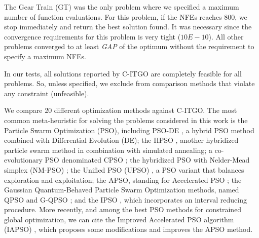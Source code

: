 

The Gear Train (GT) was the only problem where we specified a maximum number of function evaluations. For this problem, if the NFEs reaches 800, we stop immediately and return the best solution found. It was necessary since the convergence requirements for this problem is very tight ($10E-10$). All other problems converged to at least \textit{GAP} of the optimum without the requirement to specify a maximum NFEs.




In our tests, all solutions reported by C-ITGO are completely feasible for all problems. So, unless specified, we exclude from comparison methods that violate any constraint (unfeasible).

We compare 20 different optimization methods against C-ITGO. The most common meta-heuristic for solving the problems considered in this work is the Particle Swarm Optimization (PSO), including PSO-DE \citep{PSO-DE}, a hybrid PSO method combined with Differential Evolution (DE); the HPSO \citep{HPSO}, another hybridized particle swarm method in combination with simulated annealing; a co-evolutionary PSO denominated CPSO \citep{CPSO}; the hybridized PSO with Nelder-Mead simplex (NM-PSO) \citep{NM-PSO}; the Unified PSO (UPSO) \citep{UPSO}, a PSO variant that balances exploration and exploitation; the APSO, standing for Accelerated PSO  \citep{APSO}; the Gaussian Quantum-Behaved Particle Swarm Optimization methods, named QPSO and G-QPSO \citep{QPSO}; and the IPSO \citep{IPSO}, which incorporates an interval reducing procedure. More recently, and among the best PSO methods for constrained global optimization, we can cite the Improved Accelerated PSO algorithm (IAPSO) \citep{IAPSO}, which proposes some modifications and improves the APSO method.


